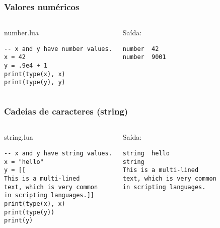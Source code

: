 \documentclass[brazil]{beamer}
\begin{document}
\begin{frame}[fragile]
  \frametitle{Valores numéricos}
  \pause
  \begin{columns}
      \begin{block}{number.lua}
        \begin{lstlisting}
-- x and y have number values.
x = 42
y = .9e4 + 1
print(type(x), x)
print(type(y), y)
        \end{lstlisting}
      \end{block}
    \pause
      \begin{block}{Saída:}
        \begin{verbatim}
number  42
number  9001  \end{verbatim}
      \end{block}
  \end{columns}
\end{frame}


\begin{frame}[fragile]
  \frametitle{Cadeias de caracteres (string)}
  \pause
  \begin{columns}
      \begin{block}{string.lua}
        \begin{lstlisting}
-- x and y have string values.
x = "hello"
y = [[
This is a multi-lined
text, which is very common
in scripting languages.]]
print(type(x), x)
print(type(y))
print(y)
        \end{lstlisting}
      \end{block}
    \pause
      \begin{block}{Saída:}
        \begin{verbatim}
string  hello
string
This is a multi-lined
text, which is very common
in scripting languages.  \end{verbatim}
      \end{block}
  \end{columns}
\end{frame}

\end{document}
